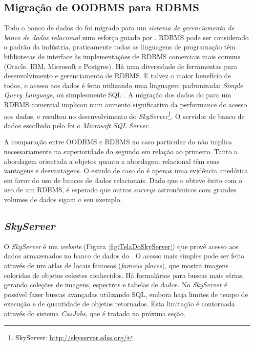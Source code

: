 \subsection{Migração de OODBMS para RDBMS}
\label{sec:CrossMatch:SDSS:MigracaoRDBMS}

Todo o banco de dados do \SDSS foi migrado para um {\em sistema de gerenciamento
de banco de dados relacional} \citep[Relational Database Management System,
RDBMS;][]{Codd1970} num esforço guiado por \citeauthor{Thakar2004}. RDBMS pode
ser considerado o padrão da indústria, praticamente todas as linguagens de
programação têm bibliotecas de interface às implementações de RDBMS comerciais
mais comuns (Oracle, IBM, Microsoft e Postgres). Há uma diversidade de
ferramentas para desenvolvimento e gerenciamento de RDBMS. E talvez o maior
benefício de todos, o acesso aos dados é feito utilizando uma linguagem
padronizada: {\em Simple Query Language}, ou simplesmente SQL
\citep{Chamberlin1974}. A migração dos dados do \SDSS para um RDBMS comercial
implicou num aumento significativo da performance do acesso aos dados, e
resultou no desenvolvimento do {\em SkyServer}\footnote{\SDSS SkyServer:
\url{http://skyserver.sdss.org/}}. O servidor de banco de dados escolhido pelo
\SDSS foi o {\em Microsoft SQL Server}.

A comparação entre OODBMS e RDBMS no caso particular do \SDSS não implica
necessariamente na superioridade do segundo em relação ao primeiro. Tanto a
abordagem orientada a objetos quanto a abordagem relacional têm suas vantagens e
desvantagens. O estudo de caso do \SDSS é apenas uma evidência anedótica em
favor do uso de bancos de dados relacionais. Dado que o \SDSS obteve êxito com o
uso de um RDBMS, é esperado que outros {\em surveys} astronômicos com grandes
volumes de dados sigam o seu exemplo.

\subsection{{\em SkyServer}}
\label{sec:CrossMatch:SDSS:SkyServer}

O {\em SkyServer} é um {\em website} (Figura \ref{fig:TelaDoSkyServer}) que
provê acesso aos dados armazenados no banco de dados do \SDSS
\citep{Szalay2002}. O acesso mais simples pode ser feito através de um atlas de
locais famosos ({\em famous places}), que mostra imagens coloridas de objetos
celestes conhecidos. Há formulários para buscas mais sérias, gerando coleções de
imagens, espectros e tabelas de dados. No {\em SkyServer} é possível fazer
buscas avançadas utilizando SQL, embora haja limites de tempo de execução e de
quantidade de objetos retornados. Esta limitação é contornada através do sistema
{\em CasJobs}, que é tratado na próxima seção.

